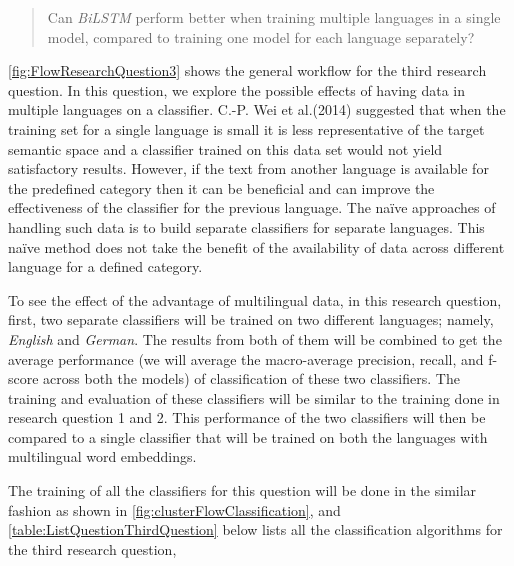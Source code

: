 \begin{quote}
    Can \textit{\gls{BiLSTM}} perform better when training multiple languages in a single model, compared to training one model for each language separately?
\end{quote}

\ref{fig:FlowResearchQuestion3} shows the general workflow for the third research question. In this question, we explore the possible effects of having data in multiple languages on a classifier. C.-P. Wei et al.(2014)\cite{Wei:2014:EPD:2566999.2567111} suggested that when the training set for a single language is small it is less representative of the target semantic space and a classifier trained on this data set would not yield satisfactory results. However, if the text from another language is available for the predefined category then it can be beneficial and can improve the effectiveness of the classifier for the previous language. The naïve approaches of handling such data is to build separate classifiers for separate languages. This naïve method does not take the benefit of the availability of data across different language for a defined category. 

To see the effect of the advantage of multilingual data, in this research question, first, two separate classifiers will be trained on two different languages; namely, \textit{English} and \textit{German}. The results from both of them will be combined to get the average performance (we will average the macro-average precision, recall, and f-score across both the models) of classification of these two classifiers. The training and evaluation of these classifiers will be similar to the training done in research question 1 and 2. This performance of the two classifiers will then be compared to a single classifier that will be trained on both the languages with multilingual word embeddings.

The training of all the classifiers for this question will be done in the similar fashion as shown in \ref{fig:clusterFlowClassification}, and \ref{table:ListQuestionThirdQuestion} below lists all the classification algorithms for the third research question,


